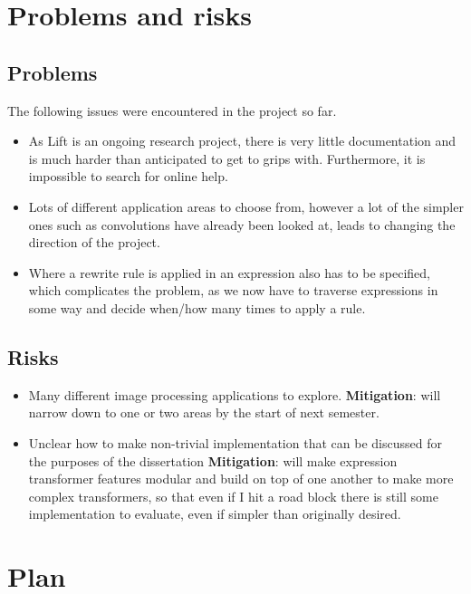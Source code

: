 \documentclass[11pt]{article}
\begin{document}
\section{Problems and risks}\label{problems-and-risks}

\subsection{Problems}\label{problems}

The following issues were encountered in the project so far.
\begin{itemize}
    \tightlist
\item As Lift is an ongoing research project, there is very little documentation and is much harder than anticipated to get to grips with. Furthermore, it is impossible to search for online help.
\item Lots of different application areas to choose from, however a lot of the simpler ones such as convolutions have already been looked at, leads to changing the direction of the project.
\item Where a rewrite rule is applied in an expression also has to be specified, which complicates the problem, as we now have to traverse expressions in some way and decide when/how many times to apply a rule.
\end{itemize}

\subsection{Risks}\label{risks}

\begin{itemize}
\tightlist
\item  Many different image processing applications to explore. \textbf{Mitigation}: will narrow down to one or two areas by the start of next semester.
\item Unclear how to make non-trivial implementation that can be discussed for the purposes of the dissertation \textbf{Mitigation}: will make expression transformer features modular and build on top of one another to make more complex transformers, so that even if I hit a road block there is still some implementation to evaluate, even if simpler than originally desired.
\end{itemize}
    
\section{Plan}\label{plan}
\end{document}
